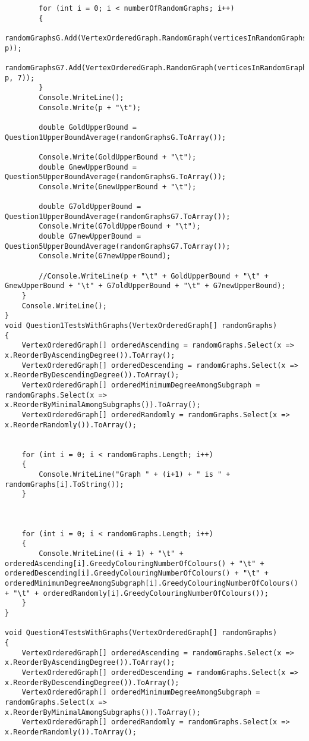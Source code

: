 \documentclass{article}
\begin{document}
\begin{lstlisting}
		for (int i = 0; i < numberOfRandomGraphs; i++)
		{
			randomGraphsG.Add(VertexOrderedGraph.RandomGraph(verticesInRandomGraphs, p));
			randomGraphsG7.Add(VertexOrderedGraph.RandomGraph(verticesInRandomGraphs, p, 7));
		}
		Console.WriteLine();
		Console.Write(p + "\t");
		
		double GoldUpperBound = Question1UpperBoundAverage(randomGraphsG.ToArray());
		
		Console.Write(GoldUpperBound + "\t");
		double GnewUpperBound = Question5UpperBoundAverage(randomGraphsG.ToArray());
		Console.Write(GnewUpperBound + "\t");
		
		double G7oldUpperBound = Question1UpperBoundAverage(randomGraphsG7.ToArray());
		Console.Write(G7oldUpperBound + "\t");
		double G7newUpperBound = Question5UpperBoundAverage(randomGraphsG7.ToArray());
		Console.Write(G7newUpperBound);
		
		//Console.WriteLine(p + "\t" + GoldUpperBound + "\t" + GnewUpperBound + "\t" + G7oldUpperBound + "\t" + G7newUpperBound);
	}
	Console.WriteLine();
}
void Question1TestsWithGraphs(VertexOrderedGraph[] randomGraphs)
{
	VertexOrderedGraph[] orderedAscending = randomGraphs.Select(x => x.ReorderByAscendingDegree()).ToArray();
	VertexOrderedGraph[] orderedDescending = randomGraphs.Select(x => x.ReorderByDescendingDegree()).ToArray();
	VertexOrderedGraph[] orderedMinimumDegreeAmongSubgraph = randomGraphs.Select(x => x.ReorderByMinimalAmongSubgraphs()).ToArray();
	VertexOrderedGraph[] orderedRandomly = randomGraphs.Select(x => x.ReorderRandomly()).ToArray();
	
	
	for (int i = 0; i < randomGraphs.Length; i++)
	{
		Console.WriteLine("Graph " + (i+1) + " is " + randomGraphs[i].ToString());
	}
	
	
	
	for (int i = 0; i < randomGraphs.Length; i++)
	{
		Console.WriteLine((i + 1) + "\t" + orderedAscending[i].GreedyColouringNumberOfColours() + "\t" + orderedDescending[i].GreedyColouringNumberOfColours() + "\t" + orderedMinimumDegreeAmongSubgraph[i].GreedyColouringNumberOfColours() + "\t" + orderedRandomly[i].GreedyColouringNumberOfColours());
	}
}

void Question4TestsWithGraphs(VertexOrderedGraph[] randomGraphs)
{
	VertexOrderedGraph[] orderedAscending = randomGraphs.Select(x => x.ReorderByAscendingDegree()).ToArray();
	VertexOrderedGraph[] orderedDescending = randomGraphs.Select(x => x.ReorderByDescendingDegree()).ToArray();
	VertexOrderedGraph[] orderedMinimumDegreeAmongSubgraph = randomGraphs.Select(x => x.ReorderByMinimalAmongSubgraphs()).ToArray();
	VertexOrderedGraph[] orderedRandomly = randomGraphs.Select(x => x.ReorderRandomly()).ToArray();
	

\end{lstlisting}
\end{document}
